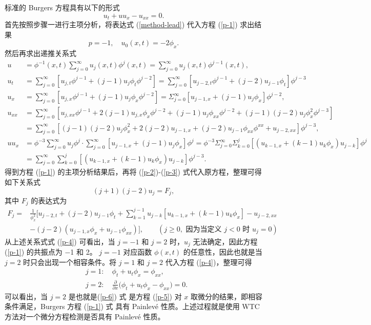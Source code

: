 标准的 Burgers 方程具有以下的形式
\begin{equation}
u_t + u u_x - u_{xx}=0.\label{p-1}
\end{equation}
首先按照步骤一进行主项分析，将表达式 (\ref{method-lead}) 代入方程 (\ref{p-1}) 求出结果
\begin{equation}
p=-1, \quad u_0(x,t)=-2 \phi_x.\nonumber
\end{equation}
然后再求出递推关系式
\begin{align}
u&=\phi^{-1}(x,t)\sum_{j=0}^{\infty}u_j(x,t)\phi^j(x,t)=\sum_{j=0}^{\infty}u_j(x,t)\phi^{j-1}(x,t),\label{p-2}\\
u_t&=\sum_{j=0}^{\infty}[u_{j,t}\phi^{j-1}+(j-1)u_j\phi_t\phi^{j-2}]=\sum_{j=0}^{\infty}[u_{j-2,t}\phi^{j-1}+(j-2)u_{j-1}\phi_t]\phi^{j-3} \\
u_x&=\sum_{j=0}^{\infty}[u_{j,x}\phi^{j-1}+(j-1)u_j\phi_x\phi^{j-2}]=\Sigma_{j=0}^{\infty}[u_{j-1,x}+(j-1)u_{j}\phi_x]\phi^{j-2}, \\
u_{xx}&=\sum_{j=0}^{\infty}[u_{j,xx}\phi^{j-1}+2(j-1)u_{j,x}\phi_x\phi^{j-2}+(j-1)u_j\phi_{xx}\phi^{j-2}+(j-1)(j-2)u_j\phi_x^2\phi^{j-3}]\nonumber\\
&=\sum_{j=0}^{\infty}[(j-1)(j-2)u_{j}\phi_x^2+2(j-2)u_{j-1,x}+(j-2)u_{j-1}\phi_{xx}\phi^{xx}+u_{j-2,xx}]\phi^{j-3}, \\
uu_x&=\phi^{-3}\sum_{j=0}^{\infty}u_j\phi^j\cdotp \sum_{j=0}^{\infty}[u_{j-1,x}+(j-1)u_j\phi_x]\phi^j =\phi^{-3}\Sigma_{j=0}^{\infty}\Sigma_{k=0}^{j}[(u_{k-1,x}+(k-1)u_k\phi_x)u_{j-k}]\phi^j\nonumber\\
&=\sum_{j=0}^{\infty}\sum_{k=0}^{j}[(u_{k-1,x}+(k-1)u_k\phi_x)u_{j-k}]\phi^{j-3}.\label{p-3}
\end{align}
得到方程 (\ref{p-1}) 的主项分析结果后，再将 (\ref{p-2})-(\ref{p-3}) 式代入原方程，整理可得如下关系式
\begin{equation}
(j+1)(j-2)u_j=F_j,\label{p-4}
\end{equation}
其中 $F_j$ 的表达式为
\begin{align}
F_j=&\frac{1}{\phi_x^2}\big[ u_{j-2,t} + (j-2) u_{j-1}\phi_t +\sum^{j-1}_{k=1} u_{j-k} [ u_{k-1,x} +
(k-1) u_k \phi_x] -u_{j-2,xx} \nonumber\\
&- (j-2)(u_{j-1,x} \phi_x +u_{j-1} \phi_{xx}) \big],  \qquad (j\geq 0, \mbox{ 因为当定义 }  j<0 \mbox{ 时 } u_j=0 )
\end{align}
从上述关系式式 (\ref{p-4}) 可看出，当 $j = −1$ 和 $j = 2$ 时，$u_j$ 无法确定，因此方程 (\ref{p-1}) 的共振点为 −1 和 2。 $j = −1$ 对应函数 $\phi(x,t)$ 的任意性，因此也就是当 $j = 2$ 时只会出现一个相容条件。将 $j = 1$ 和 $j = 2$ 代入方程 (\ref{p-4})，整理可得
\begin{align}
& j=1: \quad \phi_t +u_t \phi_x=\phi_{xx},\label{p-5}\\
& j=2: \quad \frac{\partial}{\partial x}\big( \phi_t+u_t \phi_x - \phi_{xx} \big)=0. \label{p-6}
\end{align}
可以看出，当 $j = 2$ 是也就是(\ref{p-6}) 式 是方程 (\ref{p-5}) 对 $x$ 取微分的结果，即相容条件满足，Burgers 方程 (\ref{p-1}) 式 具有 Painlev\'{e} 性质。上述过程就是使用 WTC 方法对一个微分方程检测是否具有 Painlev\'{e} 性质。

